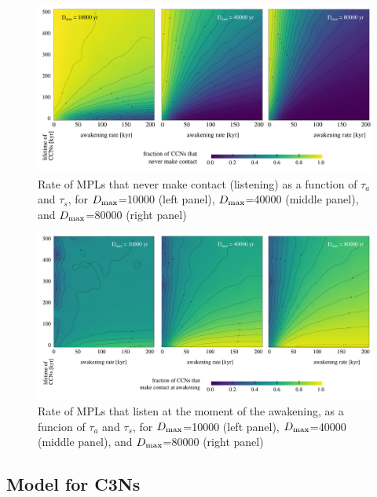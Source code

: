 \documentclass[crop]{CSLB}
\newcommand{\cetis}{C3Ns}
\begin{document}
  
\begin{figure} %
   \centering
   \includegraphics[width=\textwidth]{F_never_contact.pdf}
   \caption{
Rate of MPLs that never make contact (listening) as a
function of $\tau_a$ and $\tau_s$, for 
$D_{\rm max}$=10000 (left panel),
$D_{\rm max}$=40000 (middle panel), and
$D_{\rm max}$=80000 (right panel)
%
   }
   \label{F_never_contact}
\end{figure}
 
\begin{figure} %
   \centering
   \includegraphics[width=\textwidth]{F_C_at_A.pdf}
   \caption{
Rate of MPLs that listen at the moment of the
awakening, as a funcion of $\tau_a$ and $\tau_s$, for
$D_{\rm max}$=10000 (left panel),
$D_{\rm max}$=40000 (middle panel), and
$D_{\rm max}$=80000 (right panel)
%
   }
   \label{F_C_at_A}
\end{figure}
        

                     

\subsection{Model for \cetis{}}
\end{document}
